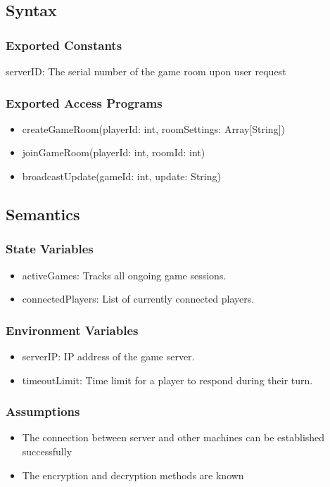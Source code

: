 \documentclass[12pt, titlepage]{article}
\begin{document}
\subsection{Syntax}

\subsubsection{Exported Constants}
\hspace{1.5em}serverID: The serial number of the game room upon user request
\subsubsection{Exported Access Programs}
\begin{itemize}
\item createGameRoom(playerId: int, roomSettings: Array[String])
\item joinGameRoom(playerId: int, roomId: int)
\item broadcastUpdate(gameId: int, update: String)
\end{itemize}

\subsection{Semantics}

\subsubsection{State Variables}
\begin{itemize}
\item activeGames: Tracks all ongoing game sessions.
\item connectedPlayers: List of currently connected players.
\end{itemize}


\subsubsection{Environment Variables}
\begin{itemize}
\item serverIP: IP address of the game server.
\item timeoutLimit: Time limit for a player to respond during their turn.
\end{itemize}

\subsubsection{Assumptions}
\begin{itemize}
\item The connection between server and other machines can be established successfully
\item The encryption and decryption methods are known
\end{itemize}
\end{document}
